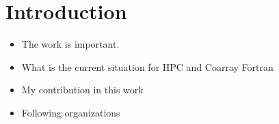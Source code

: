 \chapter{Introduction}\label{chap:Intro}
\begin{itemize}
\item The work is important.
\item What is the current situation for HPC and Coarray Fortran
\item My contribution in this work
\item Following organizations
\end{itemize}